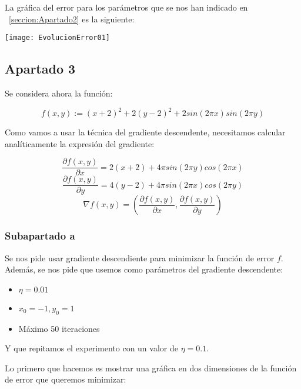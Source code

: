 \documentclass[11pt]{article}
\begin{document}
La gráfica del error para los parámetros que se nos han indicado en ~\ref{seccion:Apartado2} es la siguiente:

\texttt{[image: EvolucionError01]}

\pagebreak

\subsection{Apartado 3}

Se considera ahora la función:

\begin{displaymath}
    f(x,y) := (x+2)^2 + 2(y-2)^2 + 2 sin(2\pi x) sin(2 \pi y)
\end{displaymath}

Como vamos a usar la técnica del gradiente descendente, necesitamos calcular analíticamente la expresión del gradiente:

\begin{displaymath}
    \frac{\partial f(x,y)}{\partial x} = 2(x+2) + 4 \pi sin(2 \pi y) cos(2 \pi x)
\end{displaymath}
\begin{displaymath}
    \frac{\partial f(x,y)}{\partial y} = 4(y - 2) + 4 \pi sin(2 \pi x) cos(2 \pi y)
\end{displaymath}
\begin{displaymath}
    \nabla f(x, y) = (\frac{\partial f(x,y)}{\partial x}, \frac{\partial f(x,y)}{\partial y})
\end{displaymath}

\subsubsection{Subapartado a}

Se nos pide usar gradiente descendiente para minimizar la función de error $f$. Además, se nos pide que usemos como parámetros del gradiente descendente:

\begin{itemize}
    \item $\eta = 0.01$
    \item $x_0 = -1, y_0 = 1$
    \item Máximo 50 iteraciones
\end{itemize}

Y que repitamos el experimento con un valor de $\eta = 0.1$.

Lo primero que hacemos es mostrar una gráfica en dos dimensiones de la función de error que queremos minimizar:
\end{document}
